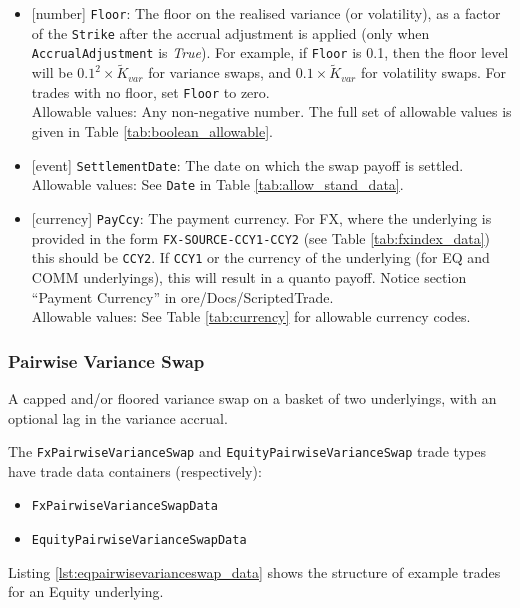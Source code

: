 \begin{itemize}
  if \lstinline!Cap! is 2.5, then the cap level will be $2.5^2 \times \widetilde{K}_{var}$ for variance swaps, and
  $2.5 \times \widetilde{K}_{vol}$ for volatility swaps. For trades with no cap, set \lstinline!Cap! to zero. \\
  Allowable values: Any non-negative number.
  \item{}[number] \lstinline!Floor!: The floor on the realised variance (or volatility), as a factor of the \lstinline!Strike! after
  the accrual adjustment is applied (only when \lstinline!AccrualAdjustment! is \emph{True}). For example,
  if \lstinline!Floor! is 0.1, then the floor level will be $0.1^2 \times \widetilde{K}_{var}$ for variance swaps, and
  $0.1 \times \widetilde{K}_{var}$ for volatility swaps. For trades with no floor, set
  \lstinline!Floor! to zero. \\
  Allowable values: Any non-negative number.
  The full set of allowable values is given in Table \ref{tab:boolean_allowable}.
  \item{}[event] \lstinline!SettlementDate!: The date on which the swap payoff is settled. \\
  Allowable values: See \lstinline!Date! in Table \ref{tab:allow_stand_data}.
  \item{}[currency] \lstinline!PayCcy!: The payment currency. For FX, where the underlying is provided
      in the form \lstinline!FX-SOURCE-CCY1-CCY2! (see Table \ref{tab:fxindex_data}) this should
      be \lstinline!CCY2!. If \lstinline!CCY1! or the currency of the underlying (for EQ and
      COMM underlyings), this will result in a quanto payoff. Notice section ``Payment Currency'' in ore/Docs/ScriptedTrade. \\
        Allowable values: See Table \ref{tab:currency} for allowable currency codes.
\end{itemize}

\subsubsection{Pairwise Variance Swap}

A capped and/or floored variance swap on a basket of two underlyings, with an optional lag in the variance accrual.

The \lstinline!FxPairwiseVarianceSwap! and \lstinline!EquityPairwiseVarianceSwap! trade types
have trade data containers (respectively):
\begin{itemize}
  \item \lstinline!FxPairwiseVarianceSwapData!
  \item \lstinline!EquityPairwiseVarianceSwapData!
\end{itemize}
Listing \ref{lst:eqpairwisevarianceswap_data} shows the structure of example trades for an Equity underlying.

